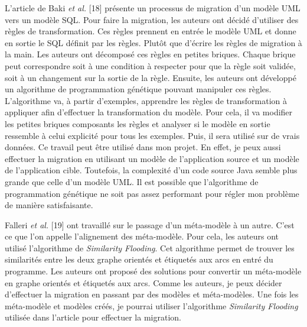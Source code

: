 \documentclass[11pt,]{article}
\begin{document}
L'article de Baki \emph{et al.} {[}18{]} présente un processus de
migration d'un modèle UML vers un modèle SQL. Pour faire la migration,
les auteurs ont décidé d'utiliser des règles de transformation. Ces
règles prennent en entrée le modèle UML et donne en sortie le SQL
définit par les règles. Plutôt que d'écrire les règles de migration à la
main. Les auteurs ont décomposé ces règles en petites briques. Chaque
brique peut correspondre soit à une condition à respecter pour que la
règle soit validée, soit à un changement sur la sortie de la règle.
Ensuite, les auteurs ont développé un algorithme de programmation
génétique pouvant manipuler ces règles. L'algorithme va, à partir
d'exemples, apprendre les règles de transformation à appliquer afin
d'effectuer la transformation du modèle. Pour cela, il va modifier les
petites briques composants les règles et analyser si le modèle en sortie
ressemble à celui explicité pour tous les exemples. Puis, il sera
utilisé sur de vrais données. Ce travail peut être utilisé dans mon
projet. En effet, je peux aussi effectuer la migration en utilisant un
modèle de l'application source et un modèle de l'application cible.
Toutefois, la complexité d'un code source Java semble plus grande que
celle d'un modèle UML. Il est possible que l'algorithme de programmation
génétique ne soit pas assez performant pour régler mon problème de
manière satisfaisante.

Falleri \emph{et al.} {[}19{]} ont travaillé sur le passage d'un
méta-modèle à un autre. C'est ce que l'on appelle l'alignement des
méta-modèle. Pour cela, les auteurs ont utilisé l'algorithme de
\emph{Similarity Flooding}. Cet algorithme permet de trouver les
similarités entre les deux graphe orientés et étiquetés aux arcs en
entré du programme. Les auteurs ont proposé des solutions pour convertir
un méta-modèle en graphe orientés et étiquetés aux arcs. Comme les
auteurs, je peux décider d'effectuer la migration en passant par des
modèles et méta-modèles. Une fois les méta-modèle et modèles créés, je
pourrai utiliser l'algorithme \emph{Similarity Flooding} utilisée dans
l'article pour effectuer la migration.
\end{document}
